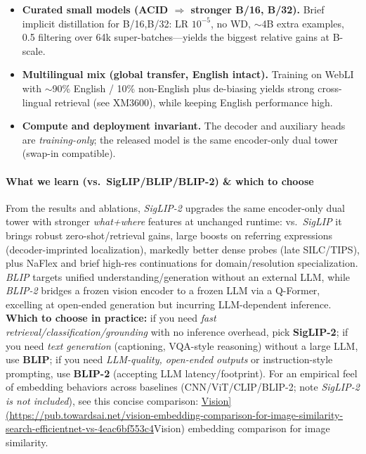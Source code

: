\begin{enrichment}
\begin{enrichment}
\begin{itemize}
            \item \textbf{Curated small models (ACID $\Rightarrow$ stronger B/16, B/32).}
            Brief implicit distillation for B/16,B/32: LR $10^{-5}$, no WD, $\sim$4B extra examples, 0.5 filtering over 64k super-batches—yields the biggest relative gains at B-scale.
            
            \item \textbf{Multilingual mix (global transfer, English intact).}
            Training on WebLI with $\sim$90\% English / 10\% non-English plus de-biasing yields strong cross-lingual retrieval (see XM3600), while keeping English performance high. 
            
            \item \textbf{Compute and deployment invariant.}
            The decoder and auxiliary heads are \emph{training-only}; the released model is the same encoder-only dual tower (swap-in compatible). 
        \end{itemize}
        
        \paragraph{What we learn (vs.\ SigLIP/BLIP/BLIP-2) \& which to choose}
        From the results and ablations, \emph{SigLIP-2} upgrades the same encoder-only dual tower with stronger \emph{what+where} features at unchanged runtime: vs.\ \emph{SigLIP} it brings robust zero-shot/retrieval gains, large boosts on referring expressions (decoder-imprinted localization), markedly better dense probes (late SILC/TIPS), plus NaFlex and brief high-res continuations for domain/resolution specialization. \emph{BLIP} targets unified understanding/generation without an external LLM, while \emph{BLIP-2} bridges a frozen vision encoder to a frozen LLM via a Q-Former, excelling at open-ended generation but incurring LLM-dependent inference. \textbf{Which to choose in practice:} if you need \emph{fast retrieval/classification/grounding} with no inference overhead, pick \textbf{SigLIP-2}; if you need \emph{text generation} (captioning, VQA-style reasoning) without a large LLM, use \textbf{BLIP}; if you need \emph{LLM-quality, open-ended outputs} or instruction-style prompting, use \textbf{BLIP-2} (accepting LLM latency/footprint). For an empirical feel of embedding behaviors across baselines (CNN/ViT/CLIP/BLIP-2; note \emph{SigLIP-2 is not included}), see this concise comparison: \href{[https://pub.towardsai.net/vision-embedding-comparison-for-image-similarity-search-efficientnet-vs-4eac6bf553c4}{Vision](https://pub.towardsai.net/vision-embedding-comparison-for-image-similarity-search-efficientnet-vs-4eac6bf553c4}{Vision) embedding comparison for image similarity}.
    
    \end{enrichment}
    
\end{enrichment}

